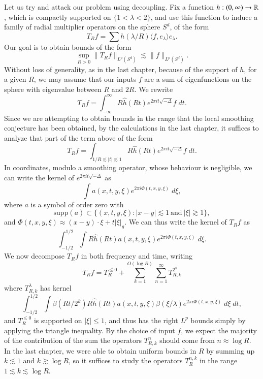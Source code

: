 Let us try and attack our problem using decoupling. Fix a function $h: (0,\infty) \to \operatorname{\mathbb{R}}$, which is compactly supported on $\{ 1 < \lambda < 2 \}$, and use this function to induce a family of radial multiplier operators on the sphere $S^d$, of the form
%
\[ T_R f = \sum h(\lambda / R) \langle f, e_\lambda \rangle e_\lambda. \]
%
Our goal is to obtain bounds of the form
%
\[ \sup_{R > 0} \| T_R f \|_{L^p(S^d)} \lesssim \| f \|_{L^p(S^d)}. \]
%
Without loss of generality, as in the last chapter, because of the support of $h$, for a given $R$, we may assume that our inputs $f$ are a sum of eigenfunctions on the sphere with eigenvalue between $R$ and $2R$. We rewrite
%
\[ T_Rf = \int_{-\infty}^\infty R \widehat{h}(Rt) e^{2 \pi i t \sqrt{-\Delta}} f\; dt. \]
%
Since we are attempting to obtain bounds in the range that the local smoothing conjecture has been obtained, by the calculations in the last chapter, it suffices to analyze that part of the term above of the form
%
\[ T_Rf = \int_{1/R \lesssim |t| \lesssim 1} R \widehat{h}(Rt) e^{2 \pi i t \sqrt{-\Delta}} f\; dt. \]
%
%
%
%
%
In coordinates, modulo a smoothing operator, whose behaviour is negligible, we can write the kernel of $e^{2 \pi i t \sqrt{-\Delta}}$ as
%
\[ \int a(x,t,y,\xi) e^{2 \pi i \Phi(t,x,y,\xi)}\; d\xi, \]
%
where $a$ is a symbol of order zero with
%
\[ \text{supp}(a) \subset \{ (x,t,y,\xi): |x - y| \lesssim 1\ \text{and}\ |\xi| \gtrsim 1 \}, \]
%
and $\Phi(t,x,y,\xi) \approx (x - y) \cdot \xi + t |\xi|_g$. We can thus write the kernel of $T_R f$ as
%
\[ \int_{-1/2}^{1/2} \int R \widehat{h}(Rt) a(x,t,y,\xi) e^{2 \pi i \Phi(t,x,y,\xi)}\; d\xi. \]
%
We now decompose $T_R f$ in both frequency and time, writing
%
\[ T_R f = T_R^{\leq 0} + \sum_{k = 1}^{O(\log R)} \sum_{n = 1}^\infty T_{R,k}^{2^n} \]
%
where $T_{R,k}^{\lambda}$ has kernel
%
\[ \int_{-1/2}^{1/2} \int \beta(Rt/2^k) R \widehat{h}(Rt) a(x,t,y,\xi) \beta(\xi / \lambda) e^{2 \pi i \Phi(t,x,y,\xi)}\; d\xi\; dt, \]
%
and $T_R^{\leq 0}$ is supported on $|\xi| \leq 1$, and thus has the right $L^p$ bounds simply by applying the triangle inequality. By the choice of input $f$, we expect the majority of the contribution of the sum the operators $T_{R,k}^n$ should come from $n \approx \log R$. In the last chapter, we were able to obtain uniform bounds in $R$ by summing up $k \lesssim 1$ and $k \gtrsim \log R$, so it suffices to study the operators $T_R^{n,k}$ in the range $1 \lesssim k \lesssim \log R$.

